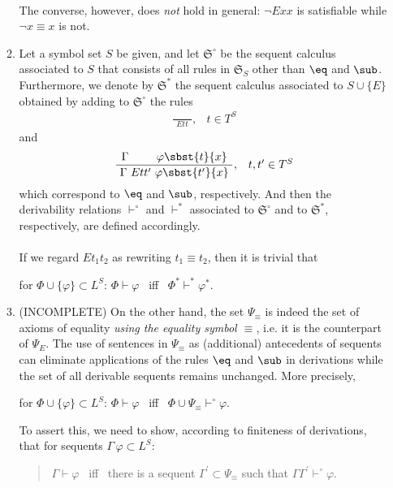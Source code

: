 \begin{enumerate}[1.]
\begin{enumerate}[(1)]
\ \\
The converse, however, does \emph{not} hold in general: $\neg E x x$ is satisfiable while $\neg x \equiv x$ is not.
\item Let a symbol set $S$ be given, and let $\mathfrak{S}^\circ$ be the sequent calculus associated to $S$ that consists of all rules in $\mathfrak{S}_S$ other than $\eq$ and $\sub$. Furthermore, we denote by $\mathfrak{S}^\ast$ the sequent calculus associated to $S \cup \{ E \}$ obtained by adding to $\mathfrak{S}^\circ$ the rules
\[
\begin{array}{ll}
\displaystyle \frac{\ }{\ \ E t t \ \ }, & t \in T^S
\end{array}
\]
and
\[
\begin{array}{ll}
\displaystyle \frac{\ \Gamma \ \phantom{E t t^\prime} \ \varphi\sbst{t}{x} \ }{\ \Gamma \ E t t^\prime \ \varphi\sbst{t^\prime}{x} \ }, & t, t^\prime \in T^S
\end{array}
\]
which correspond to $\eq$ and $\sub$, respectively. And then the derivability relations $\vdash^\circ$ and $\vdash^\ast$ associated to $\mathfrak{S}^\circ$ and to $\mathfrak{S}^\ast$, respectively, are defined accordingly.\\
\ \\
If we regard $E t_1 t_2$ as rewriting $t_1 \equiv t_2$, then it is trivial that
\begin{center}
for $\Phi \cup \{ \varphi \} \subset L^S$: $\Phi \vdash \varphi$ \ iff \ $\Phi^\ast \vdash^\ast \varphi^\ast$.
\end{center}
\item (INCOMPLETE) On the other hand, the set $\Psi_\equiv$ is indeed the set of axioms of equality \emph{using the equality symbol $\equiv$}, i.e. it is the counterpart of $\Psi_E$. The use of sentences in $\Psi_\equiv$ as (additional) antecedents of sequents can eliminate applications of the rules $\eq$ and $\sub$ in derivations while the set of all derivable sequents remains unchanged. More precisely,
\begin{center}
for $\Phi \cup \{ \varphi \} \subset L^S$: $\Phi \vdash \varphi$ \ iff \ $\Phi \cup \Psi_\equiv \vdash^\circ \varphi$.
\end{center}
To assert this, we need to show, according to finiteness of derivations, that for sequents $\Gamma \, \varphi \subset L^S$:
\begin{quote}
$\Gamma \vdash \varphi$ \ iff \ there is a sequent $\Gamma^\prime \subset \Psi_\equiv$ such that $\Gamma\Gamma^\prime \vdash^\circ \varphi$.
\end{quote}

\end{enumerate}
\end{enumerate}
